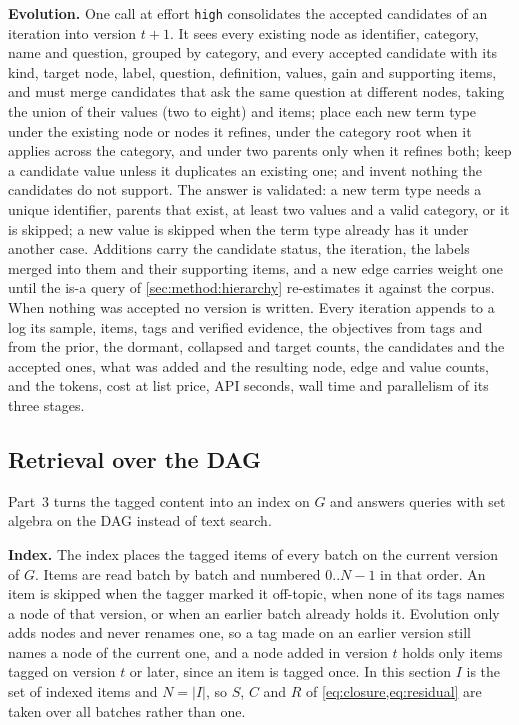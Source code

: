 \textbf{Evolution.} One call at effort \texttt{high} consolidates the accepted
candidates of an iteration into version $t{+}1$. It sees every existing node
as identifier, category, name and question, grouped by category, and every
accepted candidate with its kind, target node, label, question, definition,
values, gain and supporting items, and must merge candidates that ask the same
question at different nodes, taking the union of their values (two to eight)
and items; place each new term type under the existing node or nodes it
refines, under the category root when it applies across the category, and
under two parents only when it refines both; keep a candidate value unless it
duplicates an existing one; and invent nothing the candidates do not support.
The answer is validated: a new term type needs a unique identifier, parents
that exist, at least two values and a valid category, or it is skipped; a new
value is skipped when the term type already has it under another case.
Additions carry the candidate status, the iteration, the labels merged into
them and their supporting items, and a new edge carries weight one until the
is-a query of \cref{sec:method:hierarchy} re-estimates it against the corpus.
When nothing was accepted no version is written. Every iteration appends to a
log its sample, items, tags and verified evidence, the objectives from tags
and from the prior, the dormant, collapsed and target counts, the candidates
and the accepted ones, what was added and the resulting node, edge and value
counts, and the tokens, cost at list price, API seconds, wall time and
parallelism of its three stages.

\subsection{Retrieval over the DAG}
\label{sec:method:retrieval}

Part~3 turns the tagged content into an index on $G$ and answers queries with
set algebra on the DAG instead of text search.

\textbf{Index.} The index places the tagged items of every batch on the
current version of $G$. Items are read batch by batch and numbered
$0..N{-}1$ in that order. An item is skipped when the tagger marked it
off-topic, when none of its tags names a node of that version, or when an
earlier batch already holds it. Evolution only adds nodes and never renames
one, so a tag made on an earlier version still names a node of the current
one, and a node added in version $t$ holds only items tagged on version $t$
or later, since an item is tagged once. In this section $I$ is the set of
indexed items and $N = |I|$, so $S$, $C$ and $R$ of
\cref{eq:closure,eq:residual} are taken over all batches rather than one.

